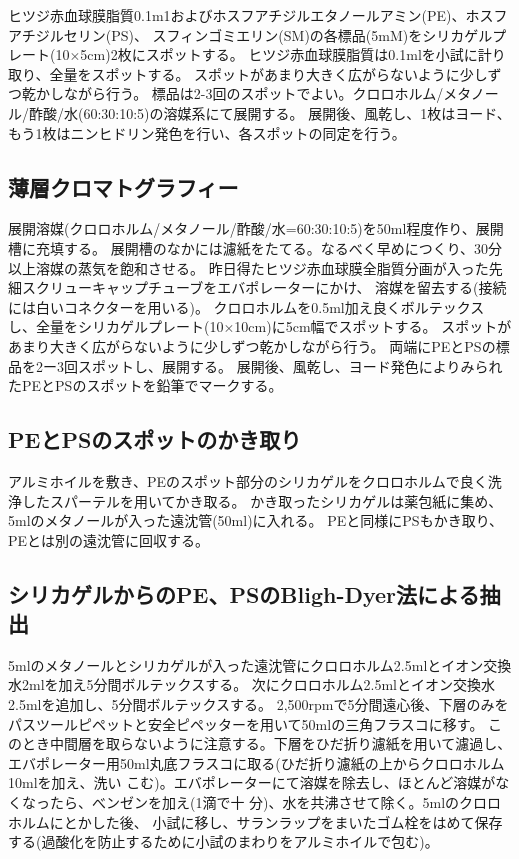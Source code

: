 \documentclass[a4paper,papersize,dvipdfmx]{jsarticle}
\begin{document}
ヒツジ赤血球膜脂質0.1m1およびホスフアチジルエタノールアミン(PE)、ホスフアチジルセリン(PS)、
スフィンゴミエリン(SM)の各標品(5mM)をシリカゲルプレート(10$\times$5cm)2枚にスポットする。
ヒツジ赤血球膜脂質は0.1mlを小試に計り取り、全量をスポットする。
スポットがあまり大きく広がらないように少しずつ乾かしながら行う。
標品は2-3回のスポットでよい。クロロホルム/メタノール/酢酸/水(60:30:10:5)の溶媒系にて展開する。
展開後、風乾し、1枚はヨード、もう1枚はニンヒドリン発色を行い、各スポットの同定を行う。

\subsection*{薄層クロマトグラフィー}

展開溶媒(クロロホルム/メタノール/酢酸/水=60:30:10:5)を50ml程度作り、展開槽に充填する。
展開槽のなかには濾紙をたてる。なるべく早めにつくり、30分以上溶媒の蒸気を飽和させる。
昨日得たヒツジ赤血球膜全脂質分画が入った先細スクリューキャップチューブをエバポレーターにかけ、
溶媒を留去する(接続には白いコネクターを用いる)。
クロロホルムを0.5ml加え良くボルテックスし、全量をシリカゲルプレート(10$\times$10cm)に5cm幅でスポットする。
スポットがあまり大きく広がらないように少しずつ乾かしながら行う。
両端にPEとPSの標品を2ー3回スポットし、展開する。
展開後、風乾し、ヨード発色によりみられたPEとPSのスポットを鉛筆でマークする。


\subsection*{PEとPSのスポットのかき取り}

アルミホイルを敷き、PEのスポット部分のシリカゲルをクロロホルムで良く洗浄したスパーテルを用いてかき取る。
かき取ったシリカゲルは薬包紙に集め、5mlのメタノールが入った遠沈管(50ml)に入れる。
PEと同様にPSもかき取り、PEとは別の遠沈管に回収する。

\subsection*{シリカゲルからのPE、PSのBligh-Dyer法による抽出}

5mlのメタノールとシリカゲルが入った遠沈管にクロロホルム2.5mlとイオン交換水2mlを加え5分間ボルテックスする。
次にクロロホルム2.5mlとイオン交換水2.5mlを追加し、5分間ボルテックスする。
2,500rpmで5分間遠心後、下層のみをパスツールピペットと安全ピペッターを用いて50mlの三角フラスコに移す。
このとき中間層を取らないように注意する。下層をひだ折り濾紙を用いて濾過し、
エバポレーター用50ml丸底フラスコに取る(ひだ折り濾紙の上からクロロホルム10mlを加え、洗い
こむ)。エバポレーターにて溶媒を除去し、ほとんど溶媒がなくなったら、べンゼンを加え(1滴で十
分)、水を共沸させて除く。5mlのクロロホルムにとかした後、
小試に移し、サランラップをまいたゴム栓をはめて保存する(過酸化を防止するために小試のまわりをアルミホイルで包む)。
\end{document}
